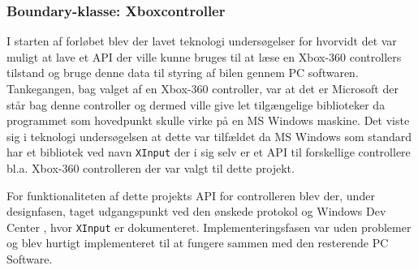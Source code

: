 \subsubsection{Boundary-klasse: Xboxcontroller} \label{sec:controller}
I starten af forløbet blev der lavet teknologi undersøgelser for hvorvidt det var muligt at lave et API der ville kunne bruges til at læse en Xbox-360 controllers tilstand og bruge denne data til styring af bilen gennem PC softwaren. Tankegangen, bag valget af en Xbox-360 controller, var at det er Microsoft der står bag denne controller og dermed ville give let tilgængelige biblioteker da programmet som hovedpunkt skulle virke på en MS Windows maskine. Det viste sig i teknologi undersøgelsen at dette var tilfældet da MS Windows som standard har et bibliotek ved navn \texttt{XInput} der i sig selv er et API til forskellige controllere bl.a. Xbox-360 controlleren der var valgt til dette projekt.

For funktionaliteten af dette projekts API for controlleren blev der, under designfasen, taget udgangspunkt ved den ønskede protokol og Windows Dev Center \cite{lib:windows_xinput}, hvor \texttt{XInput} er dokumenteret. Implementeringsfasen var uden problemer og blev hurtigt implementeret til at fungere sammen med den resterende PC Software.